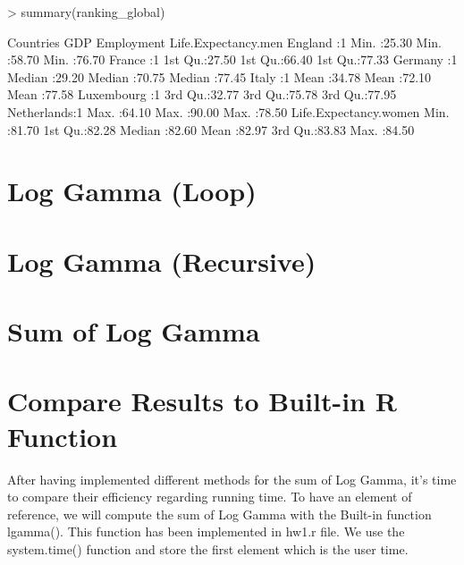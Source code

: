 \documentclass{article}
\begin{document}
\begin{Schunk}
\begin{Sinput}
> summary(ranking_global)
\end{Sinput}
\begin{Soutput}
       Countries      GDP          Employment    Life.Expectancy.men
 England    :1   Min.   :25.30   Min.   :58.70   Min.   :76.70      
 France     :1   1st Qu.:27.50   1st Qu.:66.40   1st Qu.:77.33      
 Germany    :1   Median :29.20   Median :70.75   Median :77.45      
 Italy      :1   Mean   :34.78   Mean   :72.10   Mean   :77.58      
 Luxembourg :1   3rd Qu.:32.77   3rd Qu.:75.78   3rd Qu.:77.95      
 Netherlands:1   Max.   :64.10   Max.   :90.00   Max.   :78.50      
 Life.Expectancy.women
 Min.   :81.70        
 1st Qu.:82.28        
 Median :82.60        
 Mean   :82.97        
 3rd Qu.:83.83        
 Max.   :84.50        
\end{Soutput}
\end{Schunk}

\section{Log Gamma (Loop)}

\section{Log Gamma (Recursive)}

\section{Sum of Log Gamma}

\section{Compare Results to Built-in R Function}

After having implemented different methods for the sum of Log Gamma, it's time to compare their efficiency regarding running time. To have an element of reference, we will compute the sum of Log Gamma with the Built-in function lgamma(). This function has been implemented in hw1.r file. We use the system.time() function and store the first element which is the user time.
\end{document}
